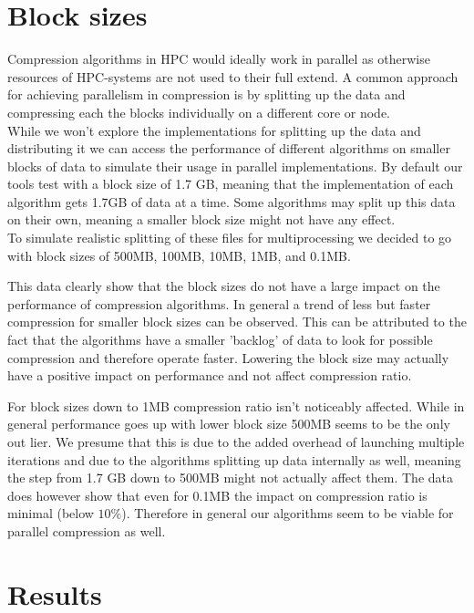 \documentclass[
	12pt,
	a4paper,
	BCOR10mm,
	DIV14,
	listof=totoc,
	bibliography=totoc,
	headsepline
]{scrreprt}
\begin{document}
\newpage
\section*{Block sizes}
Compression algorithms in HPC would ideally work in parallel as otherwise resources of HPC-systems are not used to their full extend.
A common approach for achieving parallelism in compression is by splitting up the data and compressing each the blocks individually on a different core or node\cite{BenComp}. \\
While we won't explore the implementations for splitting up the data and distributing it we can access the performance of different algorithms on smaller blocks of data to simulate their usage in parallel implementations. 
By default our tools test with a block size of 1.7 GB, meaning that the implementation of each algorithm gets 1.7GB of data at a time. 
Some algorithms may split up this data on their own, meaning a smaller block size might not have any effect. \\%
To simulate realistic splitting of these files for multiprocessing we decided to go with block sizes of 500MB, 100MB, 10MB, 1MB, and 0.1MB.


This data clearly show that the block sizes do not have a large impact on the performance of compression algorithms. 
In general a trend of less but faster compression for smaller block sizes can be observed.
This can be attributed to the fact that the algorithms have a smaller 'backlog' of data to look for possible compression and therefore operate faster\cite{ResComp}. 
Lowering the block size may actually have a positive impact on performance and not affect compression ratio.

For block sizes down to 1MB compression ratio isn't noticeably affected.
While in general performance goes up with lower block size 500MB seems to be the only out lier.
We presume that this is due to the added overhead of launching multiple iterations and due to the algorithms splitting up data internally as well, meaning the step from 1.7 GB down to 500MB might not actually affect them.
The data does however show that even for 0.1MB the impact on compression ratio is minimal (below $10\%$). 
Therefore in general our algorithms seem to be viable for parallel compression as well.

\FloatBarrier
\section{Results}
\label{Results}
\end{document}
